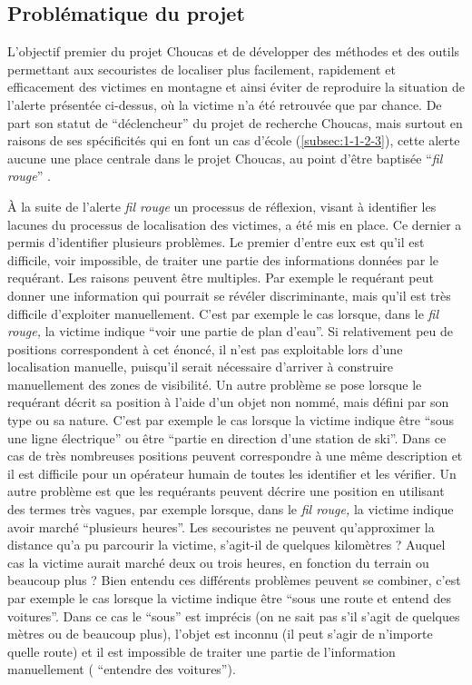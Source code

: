 \subsection{Problématique du projet}
\label{subsec:1-2-2}

L'objectif premier du projet Choucas et de développer des méthodes et
des outils permettant aux secouristes de localiser plus facilement,
rapidement et efficacement des victimes en montagne et ainsi éviter de
reproduire la situation de l'alerte présentée ci-dessus, où la victime
n'a été retrouvée que par chance. De part son statut de
\enquote{déclencheur} du projet de recherche Choucas, mais surtout en
raisons de ses spécificités qui en font un cas d'école
(\autoref{subsec:1-1-2-3}), cette alerte aucune une place centrale
dans le projet Choucas, au point d'être baptisée \enquote{\emph{fil
    rouge}} \autocite{OlteanuRaimond2017}.

À la suite de l'alerte \emph{fil rouge} un processus de réflexion,
visant à identifier les lacunes du processus de localisation des
victimes, a été mis en place. Ce dernier a permis d'identifier
plusieurs problèmes. Le premier d'entre eux est qu'il est difficile,
voir impossible, de traiter une partie des informations données par le
requérant. Les raisons peuvent être multiples. Par exemple le
requérant peut donner une information qui pourrait se révéler
discriminante, mais qu'il est très difficile d'exploiter
manuellement. C'est par exemple le cas lorsque, dans le \emph{fil
  rouge,} la victime indique \enquote{voir une partie de plan
  d'eau}. Si relativement peu de positions correspondent à cet énoncé,
il n'est pas exploitable lors d'une localisation manuelle, puisqu'il
serait nécessaire d'arriver à construire manuellement des zones de
visibilité. Un autre problème se pose lorsque le requérant décrit sa
position à l'aide d'un objet non nommé, mais défini par son type ou sa
nature. C'est par exemple le cas lorsque la victime indique être
\enquote{sous une ligne électrique} ou être \enquote{partie \textelp{}
  en direction d'une station de ski}. Dans ce cas de très nombreuses
positions peuvent correspondre à une même description et il est
difficile pour un opérateur humain de toutes les identifier et les
vérifier. Un autre problème est que les requérants peuvent décrire une
position en utilisant des termes très vagues, par exemple lorsque,
dans le \emph{fil rouge,} la victime indique avoir marché
\enquote{plusieurs heures}. Les secouristes ne peuvent qu'approximer
la distance qu'a pu parcourir la victime, s'agit-il de quelques
kilomètres ? Auquel cas la victime aurait marché deux ou trois heures,
en fonction du terrain ou beaucoup plus ? Bien entendu ces différents
problèmes peuvent se combiner, c'est par exemple le cas lorsque la
victime indique être \enquote{sous une route et entend des
  voitures}. Dans ce cas le \enquote{sous} est imprécis (\ie on ne
sait pas s'il s'agit de quelques mètres ou de beaucoup plus), l'objet
est inconnu (\ie il peut s'agir de n'importe quelle route) et il est
impossible de traiter une partie de l'information manuellement (\ie
\enquote{entendre des voitures}).

